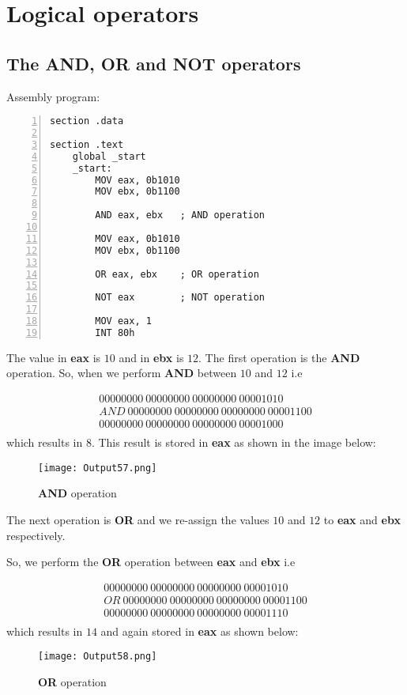 \documentclass{article}
\makeatletter
\renewcommand\paragraph{\@startsection{paragraph}{4}{\z@}{-3.25ex \@plus -1ex \@minus -.2ex}{1.5ex \@plus .2ex}{\normalfont\normalsize\bfseries}}
\makeatother
\begin{document}
\section{Logical operators}\label{sec:sec1}
\subsection{The AND, OR and NOT operators}\label{sec:subsec1}
\paragraph{}
Assembly program:
\begin{Verbatim}[numbers=left, frame=single]
section .data

section .text
	global _start
	_start:
		MOV eax, 0b1010
		MOV ebx, 0b1100
		
		AND eax, ebx   ; AND operation
		
		MOV eax, 0b1010
		MOV ebx, 0b1100
		
		OR eax, ebx    ; OR operation
		
		NOT eax        ; NOT operation
		
		MOV eax, 1
		INT 80h
\end{Verbatim}
The value in \textbf{eax} is $10$ and in \textbf{ebx} is $12$. The first operation is the \textbf{AND} operation. So, when we perform \textbf{AND} between $10$ and $12$ i.e

\begin{align*}
00000000\ 00000000\ 00000000\ 00001010 \\
AND\ 00000000\ 00000000\ 00000000\ 00001100 \\
\hline
00000000\ 00000000\ 00000000\ 00001000 \\
\end{align*}
which results in $8$. This result is stored in \textbf{eax} as shown in the image below:
\begin{figure}[h]
\centering
\texttt{[image: Output57.png]}
\caption{\textbf{AND} operation}
\label{fig:fig1}
\end{figure}
\newpage
The next operation is \textbf{OR} and we re-assign the values $10$ and $12$ to \textbf{eax} and \textbf{ebx} respectively.

So, we perform the \textbf{OR} operation between \textbf{eax} and \textbf{ebx} i.e

\begin{align*}
00000000\ 00000000\ 00000000\ 00001010 \\
OR\ 00000000\ 00000000\ 00000000\ 00001100 \\
\hline
00000000\ 00000000\ 00000000\ 00001110 \\
\end{align*}
which results in $14$ and again stored in \textbf{eax} as shown below:
\begin{figure}[h]
\centering
\texttt{[image: Output58.png]}
\caption{\textbf{OR} operation}
\label{fig:fig2}
\end{figure}
\end{document}
